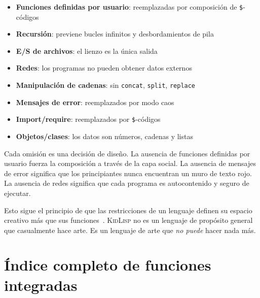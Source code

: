 \documentclass[10pt,letterpaper,twocolumn]{article}
\newcommand{\kl}{\textsc{KidLisp}}
\begin{document}
\begin{itemize}
  \item \textbf{Funciones definidas por usuario}: reemplazadas por composición de \texttt{\$}-códigos
  \item \textbf{Recursión}: previene bucles infinitos y desbordamientos de pila
  \item \textbf{E/S de archivos}: el lienzo es la única salida
  \item \textbf{Redes}: los programas no pueden obtener datos externos
  \item \textbf{Manipulación de cadenas}: sin \texttt{concat}, \texttt{split}, \texttt{replace}
  \item \textbf{Mensajes de error}: reemplazados por modo caos
  \item \textbf{Import/require}: reemplazados por \texttt{\$}-códigos
  \item \textbf{Objetos/clases}: los datos son números, cadenas y listas
\end{itemize}

Cada omisión es una decisión de diseño. La ausencia de funciones definidas por usuario fuerza la composición a través de la capa social. La ausencia de mensajes de error significa que los principiantes nunca encuentran un muro de texto rojo. La ausencia de redes significa que cada programa es autocontenido y seguro de ejecutar.

Esto sigue el principio de que las restricciones de un lenguaje definen su espacio creativo más que sus funciones~\citep{papert1980mindstorms, compton2015casual}. \kl{} no es un lenguaje de propósito general que casualmente hace arte. Es un lenguaje de arte que \emph{no puede} hacer nada más.

\section{Índice completo de funciones integradas}
\end{document}
